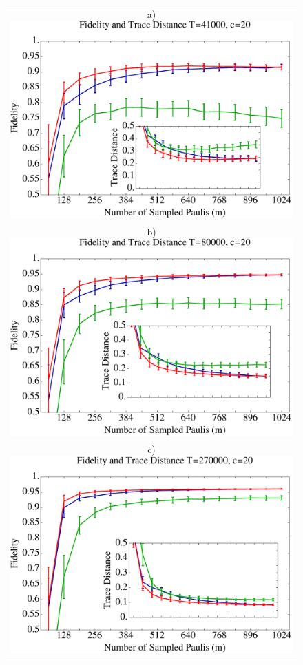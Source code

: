 \begin{figure}[t!]
\centering
\begin{tabular}{c}
a)\hspace{-10pt} \includegraphics[scale=.42]{figures/41} \vspace{5pt}\\
b)\hspace{-10pt} \includegraphics[scale=.42]{figures/80}  \vspace{5pt}\\
c)\hspace{-10pt} \includegraphics[scale=.42]{figures/270}

\end{tabular}
\end{figure}
